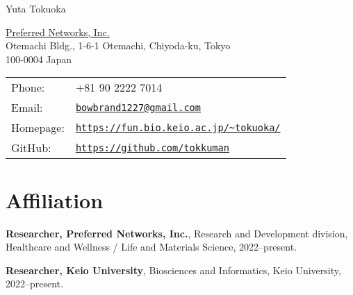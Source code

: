 \documentclass[letterpaper]{article}
\def\name{Yuta Tokuoka}
\renewenvironment{itemize}{
  \begin{list}{}{
    \setlength{\leftmargin}{1.5em}
  }
}{
  \end{list}
}
\begin{document}
{\huge \name}


\vspace{0.25in}

\begin{minipage}{0.45\linewidth}
  \href{http://www.unc.edu/}{Preferred Networks, Inc.} \\
  Otemachi Bldg., 1-6-1 Otemachi, Chiyoda-ku, Tokyo \\
  100-0004 Japan
\end{minipage}
\begin{minipage}{0.45\linewidth}
  \begin{tabular}{ll}
   Phone: & +81 90 2222 7014 \\
   Email: & \href{mailto:bowbrand1227@gmail.com}{\tt bowbrand1227@gmail.com} \\
   Homepage: & \href{https://fun.bio.keio.ac.jp/\~tokuoka/}{\tt \url{https://fun.bio.keio.ac.jp/\~tokuoka/}} \\
   GitHub: & \href{https://github.com/tokkuman}{\tt \url{https://github.com/tokkuman}} \\
  \end{tabular}
\end{minipage}

\vspace{0.6cm}




\section*{\bf Affiliation}
\vspace{-0.6cm}
\hrulefill

\begin{itemize}
 \item {\bf Researcher, Preferred Networks, Inc.}, Research and Development division, Healthcare and Wellness / Life and Materials Science, 2022--present.
 \item {\bf Researcher, Keio University}, Biosciences and Informatics, Keio University, 2022--present.
       \\
\end{itemize}
\end{document}
